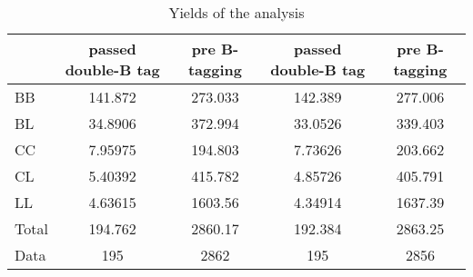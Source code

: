 \documentclass[10pt]{article}
\begin{document}
\begin{table}[htbp]
\begin{center}
\begin{tabular}{|l|S|S|S|S|}
\hline 
 & {passed double-B tag} & {pre B-tagging} & {passed double-B tag} & {pre B-tagging}\\
\hline 
  BB   & 141.872  & 273.033  & 142.389  & 277.006  \\ 
  BL   & 34.8906  & 372.994  & 33.0526  & 339.403  \\ 
  CC   & 7.95975  & 194.803  & 7.73626  & 203.662  \\ 
  CL   & 5.40392  & 415.782  & 4.85726  & 405.791  \\ 
  LL   & 4.63615  & 1603.56  & 4.34914  & 1637.39  \\ 
\hline 
  Total  & 194.762  & 2860.17  & 192.384  & 2863.25  \\ 
\hline 
  Data   & 195 & 2862 & 195 & 2856 \\ 
\hline 
\end{tabular} 
\caption{Yields of the analysis} 
\end{center} 
\end{table} 
\end{document}
